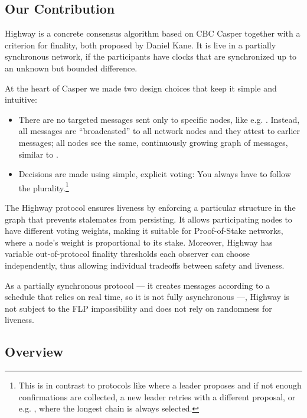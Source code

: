 \documentclass[12pt]{article}
\begin{document}
\subsection*{Our Contribution}

Highway is a concrete consensus algorithm based on CBC Casper \cite{zamfir2018casper} together with a criterion for finality, both proposed by Daniel Kane. It is live in a partially synchronous network, if the participants have clocks that are synchronized up to an unknown but bounded difference.

At the heart of Casper we made two design choices that keep it simple and intuitive:
\begin{itemize}
  \item There are no targeted messages sent only to specific nodes, like e.g. \cite{miller2016honey}. Instead, all messages are ``broadcasted'' to all network nodes and they attest to earlier messages; all nodes see the same, continuously growing graph of messages, similar to \cite{baird2016hashgraph,chevalier2018parsec,gkagol2019aleph,moser1999byzantine}.
  \item Decisions are made using simple, explicit voting: You always have to follow the plurality.\footnote{This is in contrast to protocols like \cite{buchman2018latest,castro1999practical,muratov2018yac} where a leader proposes and if not enough confirmations are collected, a new leader retries with a different proposal, or e.g. \cite{kiayias2017ouroboros}, where the longest chain is always selected.}
\end{itemize}

The Highway protocol ensures liveness by enforcing a particular structure in the graph that prevents stalemates from persisting.
It allows participating nodes to have different voting weights, making it suitable for Proof-of-Stake networks, where a node's weight is proportional to its stake. Moreover, Highway has variable out-of-protocol finality thresholds each observer can choose independently, thus allowing individual tradeoffs between safety and liveness.

As a partially synchronous protocol --- it creates messages according to a schedule that relies on real time, so it is not fully asynchronous ---, Highway is not subject to the FLP impossibility \cite{fischer1982impossibility} and does not rely on randomness for liveness.


\subsection*{Overview}
\end{document}
